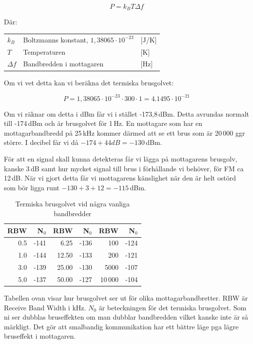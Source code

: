 $$P=k_BT\Delta f$$

Där:

\begin{tabular}{lll}
	$k_B$      & Boltzmanns konstant, $1,38065\cdot 10^{-23}$ & [J/K] \\
	$T$        & Temperaturen                                 & [K]   \\
	$\Delta f$ & Bandbredden i mottagaren                     & [Hz]
\end{tabular}

Om vi vet detta kan vi beräkna det termiska brusgolvet:

$$P = 1,38065\cdot 10^{-23} \cdot 300 \cdot 1 = 4.1495\cdot 10^{-21}$$

Om vi räknar om detta i dBm får vi i stället -173,8\,dBm. Detta avrundas normalt till -174\,dBm och är brusgolvet för 1\,Hz. En mottagare som har en mottagarbandbredd på 25\,kHz kommer därmed att se ett brus som är 20\,000 ggr större. I decibel får vi då $-174 + 44 dB = -130$\,dBm.

För att en signal skall kunna detekteras får vi lägga på mottagarens brusgolv, kanske 3\,dB samt hur mycket signal till brus i förhållande vi behöver, för FM ca 12\,dB. När vi gjort detta får vi mottagarens känslighet när den är helt ostörd som bör ligga runt $-130 + 3 + 12 = -115$\,dBm.

\begin{table}[H]
\centering
\begin{tabular}{rr|rr|rr}
	\textbf{RBW} & \textbf{N$_0$} & \textbf{RBW} & \textbf{N$_0$} & \textbf{RBW} & \textbf{N$_0$} \\ \hline
	         0.5 &           -141 &         6.25 &           -136 &          100 &           -124 \\
	         1.0 &           -144 &        12.50 &           -133 &          200 &           -121 \\
	         3.0 &           -139 &        25.00 &           -130 &         5000 &           -107 \\
	         5.0 &           -137 &        50.00 &           -127 &        10\,000 &           -104
\end{tabular}
\caption{Termiska brusgolvet vid några vanliga bandbredder}
\end{table}

Tabellen ovan visar hur brusgolvet ser ut för olika mottagarbandbretter. RBW är Receive Band Width i kHz. $N_0$ är beteckningen för det termiska brusgolvet. Som ni ser dubblas bruseffekten om man dubblar bandbredden vilket kanske inte är så märkligt. Det gör att smalbandig kommunikation har ett bättre läge pga lägre bruseffekt i mottagaren.


